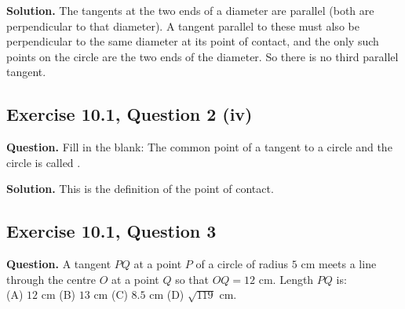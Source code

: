 \textbf{Solution.} The tangents at the two ends of a diameter are parallel (both are perpendicular to that diameter). A tangent parallel to these must also be perpendicular to the same diameter at its point of contact, and the only such points on the circle are the two ends of the diameter. So there is no third parallel tangent.


\subsection*{Exercise 10.1, Question 2 (iv)}
\textbf{Question.} Fill in the blank: The common point of a tangent to a circle and the circle is called \underline{\hspace{2cm}}.

\textbf{Solution.} This is the definition of the point of contact.


\subsection*{Exercise 10.1, Question 3}
\textbf{Question.} A tangent $PQ$ at a point $P$ of a circle of radius $5$ cm meets a line through the centre $O$ at a point $Q$ so that $OQ=12$ cm. Length $PQ$ is:\\
(A) $12$ cm \qquad (B) $13$ cm \qquad (C) $8.5$ cm \qquad (D) $\sqrt{119}$ cm.

\begin{center}
%
\end{center}

